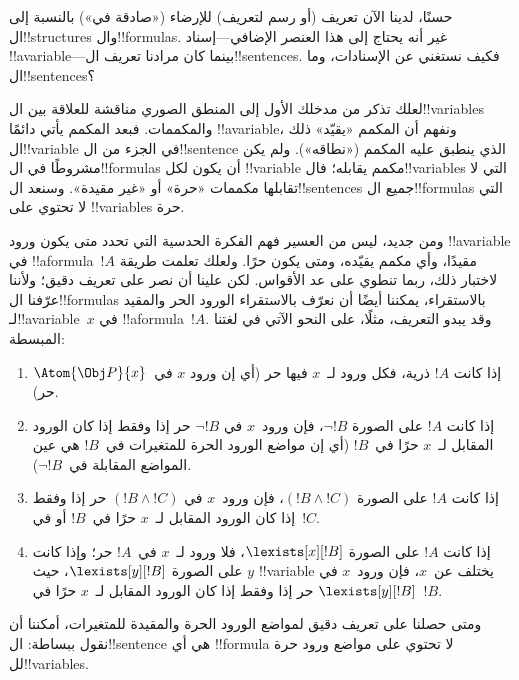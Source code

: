 \documentclass[../../../include/open-logic-section]{subfiles}
\begin{document}


حسنًا، لدينا الآن تعريف (أو رسم لتعريف) للإرضاء («صادقة في») بالنسبة
إلى ال!!{structure}s وال!!{formula}s. غير أنه يحتاج إلى هذا العنصر
الإضافي---إسناد !!a{variable}---بينما كان مرادنا تعريف
ال!!{sentence}s. فكيف نستغني عن الإسنادات، وما ال!!{sentence}s؟

لعلك تذكر من مدخلك الأول إلى المنطق الصوري مناقشة للعلاقة بين
ال!!{variable}s والمكممات. فبعد المكمم يأتي دائمًا !!a{variable}، ونفهم
أن المكمم «يقيّد» ذلك ال!!{variable} في الجزء من ال!!{sentence} الذي
ينطبق عليه المكمم («نطاقه»). ولم يكن مشروطًا في ال!!{formula}s أن يكون
لكل !!{variable} مكمم يقابله؛ فال!!{variable}s التي لا تقابلها مكممات
«حرة» أو «غير مقيدة». وسنعد ال!!{sentence}s جميع ال!!{formula}s التي
لا تحتوي على !!{variable}s حرة.

ومن جديد، ليس من العسير فهم الفكرة الحدسية التي تحدد متى يكون ورود
!!a{variable} في !!a{formula}~$!A$ مقيدًا، وأي مكمم يقيّده، ومتى يكون
حرًا. ولعلك تعلمت طريقة لاختبار ذلك، ربما تنطوي على عد الأقواس. لكن
علينا أن نصر على تعريف دقيق؛ ولأننا عرّفنا ال!!{formula}s بالاستقراء،
يمكننا أيضًا أن نعرّف بالاستقراء الورود الحر والمقيد لـ!!a{variable}~$x$
في !!a{formula}~$!A$. وقد يبدو التعريف، مثلًا، على النحو الآتي في
لغتنا المبسطة:
\begin{enumerate}
  \item إذا كانت $!A$ ذرية، فكل ورود لـ~$x$ فيها حر (أي إن ورود
  $x$ في~$\Atom{\Obj P}{x}$ حر).
  \item إذا كانت $!A$ على الصورة $\lnot !B$، فإن ورود~$x$ في
  $\lnot !B$ حر إذا وفقط إذا كان الورود المقابل لـ~$x$ حرًا في~$!B$
  (أي إن مواضع الورود الحرة للمتغيرات في~$!B$ هي عين المواضع المقابلة
  في~$\lnot !B$).
  \item إذا كانت $!A$ على الصورة $(!B \land !C)$، فإن ورود~$x$ في
  $(!B \land !C)$ حر إذا وفقط إذا كان الورود المقابل لـ~$x$ حرًا
  في~$!B$ أو في~$!C$.
  \item إذا كانت $!A$ على الصورة $\lexists[x][!B]$، فلا ورود لـ~$x$
  في~$!A$ حر؛ وإذا كانت على الصورة $\lexists[y][!B]$، حيث $y$
  !!{variable} يختلف عن~$x$، فإن ورود~$x$ في $\lexists[y][!B]$ حر
  إذا وفقط إذا كان الورود المقابل لـ~$x$ حرًا في~$!B$.
\end{enumerate}

ومتى حصلنا على تعريف دقيق لمواضع الورود الحرة والمقيدة للمتغيرات،
أمكننا أن نقول ببساطة: ال!!{sentence} هي أي !!{formula} لا تحتوي على
مواضع ورود حرة لل!!{variable}s.
\end{document}
